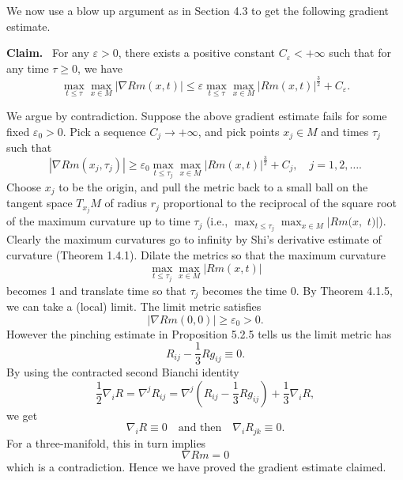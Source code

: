 We now use a blow up argument as in Section 4.3 to get the
following gradient estimate.

\medskip
{\bf Claim.} \ For any $\varepsilon>0$, there exists a positive
constant $C_\varepsilon<+\infty$ such that for any time $\tau\ge
0$, we have
$$
\max_{t\le\tau}\max_{x\in M}|\nabla Rm(x,t)| \le \varepsilon
\max_{t\le\tau}\max_{x\in M}|Rm(x,t)|^\frac{3}{2}+C_\varepsilon.
$$

\medskip
We argue by contradiction. Suppose the above gradient estimate
fails for some fixed $\varepsilon_0>0$. Pick a sequence
$C_j\rightarrow+\infty$, and pick points $x_j\in M$ and times
$\tau_j$ such that
$$
|\nabla Rm(x_j,\tau_j)|\ge\varepsilon_0\max_{t\le\tau_j}
\max_{x\in M}|Rm(x,t)|^\frac{3}{2}+C_j,\quad j=1,2,\ldots.
$$
Choose $x_j$ to be the origin, and pull the metric back to a small
ball on the tangent space $T_{x_j}M$ of radius $r_j$ proportional
to the reciprocal of the square root of the maximum curvature up
to time $\tau_j$ (i.e., $\max_{t\le\tau_j}\max_{x\in M}|Rm(x,$
$t)|$). Clearly the maximum curvatures go to infinity by Shi's
derivative estimate of curvature (Theorem 1.4.1). Dilate the
metrics so that the maximum curvature
$$
\max_{t\le\tau_j}\max_{x\in M}|Rm(x,t)|
$$
becomes 1 and translate time so that $\tau_j$ becomes the time 0.
By Theorem 4.1.5, we can take a (local) limit. The limit metric
satisfies
$$
|\nabla Rm(0,0)|\ge \varepsilon_0>0.
$$
However the pinching estimate in Proposition 5.2.5 tells us the
limit metric has
$$
R_{ij}-\frac{1}{3}Rg_{ij}\equiv 0.
$$
By using the contracted second Bianchi identity
$$
\frac{1}{2}\nabla_iR =\nabla^jR_{ij}
=\nabla^j\left(R_{ij}-\frac{1}{3}Rg_{ij}\right)+\frac{1}{3}\nabla_iR,
$$
we get
$$
\nabla_iR\equiv0\quad \text{and then}\quad \nabla_iR_{jk}\equiv0.
$$
For a three-manifold, this in turn implies
$$
\nabla Rm=0
$$
which is a contradiction. Hence we have proved the gradient
estimate claimed.

